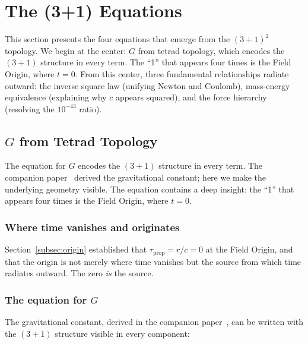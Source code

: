 \documentclass[aps,prd,preprint,superscriptaddress,showpacs,preprintnumbers,amsmath,amssymb,nofootinbib]{revtex4-2}
\begin{document}
\section{The (3+1) Equations}
\label{sec:five}

This section presents the four equations that emerge from the $(3+1)^2$ topology. We begin at the center: $G$ from tetrad topology, which encodes the $(3+1)$ structure in every term. The ``1'' that appears four times is the Field Origin, where $t = 0$. From this center, three fundamental relationships radiate outward: the inverse square law (unifying Newton and Coulomb), mass-energy equivalence (explaining why $c$ appears squared), and the force hierarchy (resolving the $10^{-43}$ ratio).

\subsection{$G$ from Tetrad Topology}
\label{subsec:master-eq}

The equation for $G$ encodes the $(3+1)$ structure in every term. The companion paper~\cite{paper6} derived the gravitational constant; here we make the underlying geometry visible. The equation contains a deep insight: the ``1'' that appears four times is the Field Origin, where $t = 0$.

\subsubsection*{Where time vanishes and originates}

Section~\ref{subsec:origin} established that $\tau_{\text{prop}} = r/c = 0$ at the Field Origin, and that the origin is not merely where time vanishes but the source from which time radiates outward. The zero \emph{is} the source.

\subsubsection*{The equation for $G$}

The gravitational constant, derived in the companion paper~\cite{paper6}, can be written with the $(3+1)$ structure visible in every component:
\end{document}
